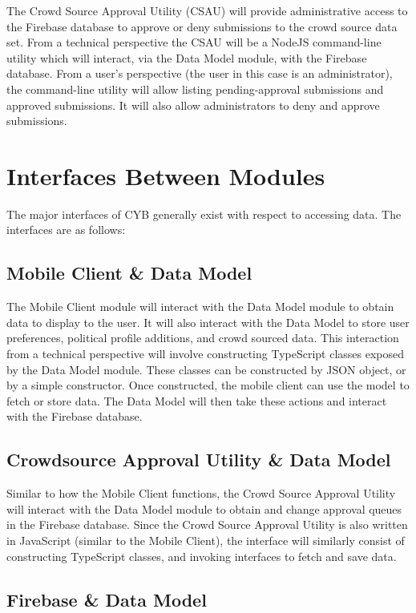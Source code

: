 \documentclass[11pt]{article}
\begin{document}
The Crowd Source Approval Utility (CSAU) will provide administrative access to the Firebase database to approve or deny submissions to the crowd source data set. From a technical perspective the CSAU will be a NodeJS command-line utility which will interact, via the Data Model module, with the Firebase database. From a user’s perspective (the user in this case is an administrator), the command-line utility will allow listing pending-approval submissions and approved submissions. It will also allow administrators to deny and approve submissions.

\section{Interfaces Between Modules}

The major interfaces of CYB generally exist with respect to accessing data. The interfaces are as follows:

\subsection*{Mobile Client \& Data Model}

The Mobile Client module will interact with the Data Model module to obtain data to display to the user. It will also interact with the Data Model to store user preferences, political profile additions, and crowd sourced data. This interaction from a technical perspective will involve constructing TypeScript classes exposed by the Data Model module. These classes can be constructed by JSON object, or by a simple constructor. Once constructed, the mobile client can use the model to fetch or store data. The Data Model will then take these actions and interact with the Firebase database.

\subsection*{Crowdsource Approval Utility \& Data Model}

Similar to how the Mobile Client functions, the Crowd Source Approval Utility will interact with the Data Model module to obtain and change approval queues in the Firebase database. Since the Crowd Source Approval Utility is also written in JavaScript (similar to the Mobile Client), the interface will similarly consist of constructing TypeScript classes, and invoking interfaces to fetch and save data.

\subsection*{Firebase \& Data Model}
\end{document}
